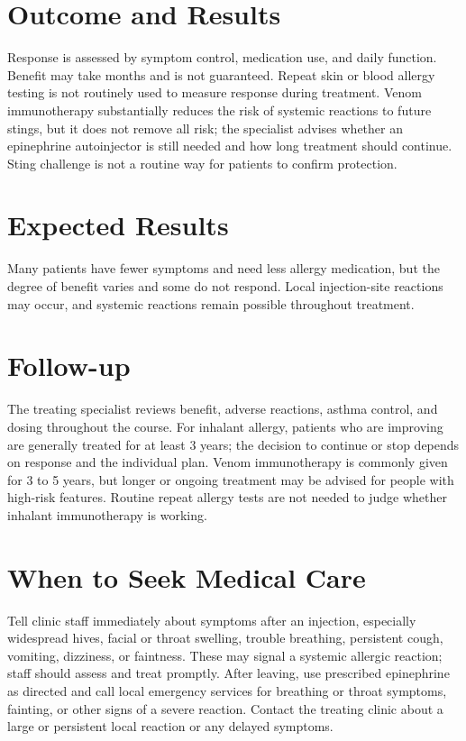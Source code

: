 \section*{Outcome and Results}
Response is assessed by symptom control, medication use, and daily function. Benefit may take months and is not guaranteed. Repeat skin or blood allergy testing is not routinely used to measure response during treatment. Venom immunotherapy substantially reduces the risk of systemic reactions to future stings, but it does not remove all risk; the specialist advises whether an epinephrine autoinjector is still needed and how long treatment should continue. Sting challenge is not a routine way for patients to confirm protection.

\section*{Expected Results}
Many patients have fewer symptoms and need less allergy medication, but the degree of benefit varies and some do not respond. Local injection-site reactions may occur, and systemic reactions remain possible throughout treatment.

\section*{Follow-up}
The treating specialist reviews benefit, adverse reactions, asthma control, and dosing throughout the course. For inhalant allergy, patients who are improving are generally treated for at least 3 years; the decision to continue or stop depends on response and the individual plan. Venom immunotherapy is commonly given for 3 to 5 years, but longer or ongoing treatment may be advised for people with high-risk features. Routine repeat allergy tests are not needed to judge whether inhalant immunotherapy is working.

\section*{When to Seek Medical Care}
Tell clinic staff immediately about symptoms after an injection, especially widespread hives, facial or throat swelling, trouble breathing, persistent cough, vomiting, dizziness, or faintness. These may signal a systemic allergic reaction; staff should assess and treat promptly. After leaving, use prescribed epinephrine as directed and call local emergency services for breathing or throat symptoms, fainting, or other signs of a severe reaction. Contact the treating clinic about a large or persistent local reaction or any delayed symptoms.

